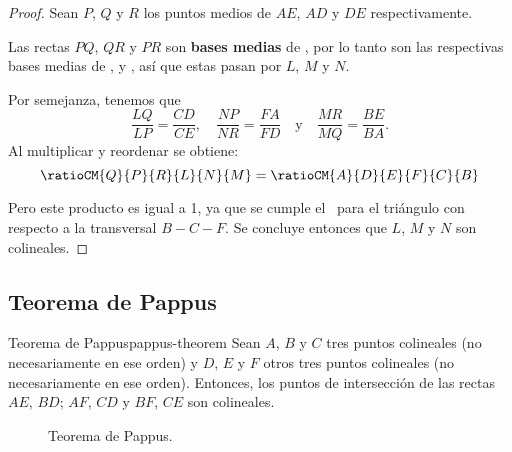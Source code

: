 \begin{proof}
    Sean $P$, $Q$ y $R$ los puntos medios de $AE$, $AD$ y $DE$ respectivamente.

    \begin{multicols}{2}
        \begin{figure}[H]
            \centering
            
        \end{figure}

        Las rectas $PQ$, $QR$ y $PR$ son \textbf{bases medias} de , por lo tanto son las respectivas bases medias de ,  y , así que estas pasan por $L$, $M$ y $N$.

        Por semejanza, tenemos que
        \[
            \frac{LQ}{LP} = \frac{CD}{CE},\quad \frac{NP}{NR} = \frac{FA}{FD}\quad \text{y} \quad \frac{MR}{MQ} = \frac{BE}{BA}.
        \]
        Al multiplicar y reordenar se obtiene:
        \[
            \ratioCM{Q}{P}{R}{L}{N}{M} = \ratioCM{A}{D}{E}{F}{C}{B}
        \]
    \end{multicols}

    Pero este producto es igual a 1, ya que se cumple el~ para el triángulo  con respecto a la transversal $B - C - F$.
    Se concluye entonces que $L$, $M$ y $N$ son colineales.
\end{proof}




\subsection{Teorema de Pappus}

\begin{section-theorem.tcb}{Teorema de Pappus}{pappus-theorem}
    Sean $A$, $B$ y $C$ tres puntos colineales (no necesariamente en ese orden) y $D$, $E$ y $F$ otros tres puntos colineales (no necesariamente en ese orden).
    Entonces, los puntos de intersección de las rectas $AE$, $BD$; $AF$, $CD$ y $BF$, $CE$ son colineales.
\end{section-theorem.tcb}

\begin{figure}[H]
    \centering
    
    \caption{Teorema de Pappus.}
    \label{fig:pappus-theorem}
\end{figure}

